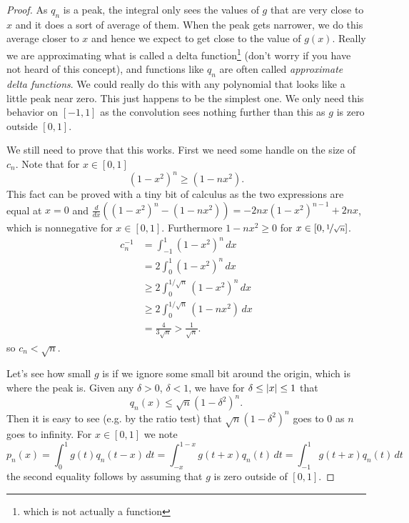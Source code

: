 \begin{proof}
As $q_n$ is a peak, the integral
only sees the values of $g$ that are
very close to $x$ and it does a sort of average of them.
When the peak gets narrower, we do this average closer to $x$
and hence we expect to get close to the value of $g(x)$.  Really we are
approximating what is called a delta function\footnote{which is not actually
a function} (don't worry if you have not
heard of this concept),
and functions like $q_n$ are often called
\emph{approximate delta functions}.
We could really do this with any polynomial that looks like a little peak
near zero.  This just happens to be the simplest one.
We only need this behavior on $[-1,1]$ as the convolution sees nothing
further than this as $g$ is zero outside $[0,1]$.

We still need to prove that this works.  First we need some handle on the
size of $c_n$.  Note that for $x \in [0,1]$
\begin{equation*}
{(1-x^2)}^n \geq (1-nx^2) .
\end{equation*}
This fact can be proved with a tiny bit of calculus as the two expressions are
equal at $x=0$ and 
$\frac{d}{dx}\left({(1-x^2)}^n - (1-nx^2)\right)
=-2nx{(1-x^2)}^{n-1}+2nx$, which is nonnegative for $x \in [0,1]$.
Furthermore $1-nx^2 \geq 0$ for $x \in [0,\nicefrac{1}{\sqrt{n}}]$.
\begin{equation*}
\begin{split}
c_n^{-1} & = \int_{-1}^1 {(1-x^2)}^n\,dx \\
& = 2\int_0^1 {(1-x^2)}^n\,dx \\
& \geq 2\int_0^{1/\sqrt{n}} {(1-x^2)}^n\,dx \\
& \geq 2\int_0^{1/\sqrt{n}} (1-nx^2) \,dx \\
& = \frac{4}{3\sqrt{n}}
> \frac{1}{\sqrt{n}} .
\end{split}
\end{equation*}
so $c_n < \sqrt{n}$.

Let's see how small $g$ is if we ignore some small bit around the origin,
which is where the peak is.
Given any $\delta > 0$, $\delta < 1$, we have for $\delta \leq \lvert {x} \rvert \leq
1$ that
\begin{equation*}
q_n(x) \leq \sqrt{n}{(1-\delta^2)}^n .
\end{equation*}
Then it is easy to see  (e.g. by the ratio test) that
$\sqrt{n}{(1-\delta^2)}^n$ goes to 0 as $n$ goes to infinity.
For $x \in [0,1]$ we note
\begin{equation*}
p_n(x) = 
\int_{0}^1 g(t)q_n(t-x) \,dt
=
\int_{-x}^{1-x} g(t+x)q_n(t) \,dt
=
\int_{-1}^{1} g(t+x)q_n(t) \,dt
\end{equation*}
the second equality follows by assuming that $g$ is zero outside of
$[0,1]$.


\end{proof}
